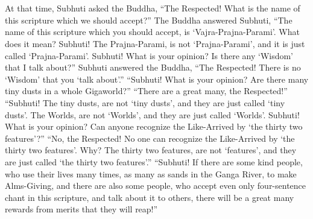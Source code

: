 \documentclass[a5paper,12pt]{book}
\begin{document}
    ~

    ~

     At that time, Subhuti asked the Buddha, ``The Respected! What is the name of this scripture which we should accept?'' The Buddha answered Subhuti, ``The name of this scripture which you should accept, is `Vajra-Prajna-Parami'. What does it mean? Subhuti! The Prajna-Parami, is not `Prajna-Parami', and it is just called `Prajna-Parami'. Subhuti! What is your opinion? Is there any `Wisdom' that I talk about?'' Subhuti answered the Buddha, ``The Respected! There is no `Wisdom' that you `talk about'.'' ``Subhuti! What is your opinion? Are there many tiny dusts in a whole Gigaworld?'' ``There are a great many, the Respected!'' ``Subhuti! The tiny dusts, are not `tiny dusts', and they are just called `tiny dusts'. The Worlds, are not `Worlds', and they are just called `Worlds'. Subhuti! What is your opinion? Can anyone recognize the Like-Arrived by `the thirty two features'?'' ``No, the Respected! No one can recognize the Like-Arrived by `the thirty two features'. Why? The thirty two features, are not `features', and they are just called `the thirty two features'.'' ``Subhuti! If there are some kind people, who use their lives many times, as many as sands in the Ganga River, to make Alms-Giving, and there are also some people, who accept even only four-sentence chant in this scripture, and talk about it to others, there will be a great many rewards from merits that they will reap!''

    ~
\end{document}
